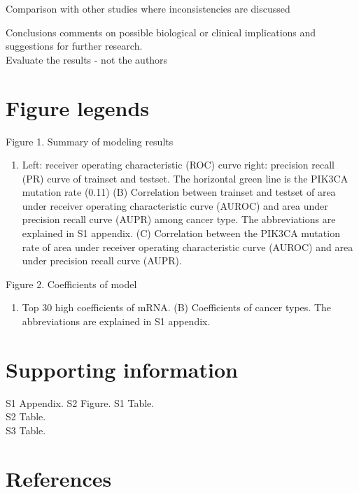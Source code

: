 \documentclass[10pt,letterpaper]{article}
\providecommand{\tightlist}{%
  \setlength{\itemsep}{0pt}\setlength{\parskip}{0pt}}
\begin{document}
Comparison with other studies where inconsistencies are discussed

Conclusions comments on possible biological or clinical implications and
suggestions for further research.\\
Evaluate the results - not the authors

\hypertarget{figure-legends}{%
\section{Figure legends}\label{figure-legends}}

Figure 1. Summary of modeling results

\begin{enumerate}
\def\labelenumi{(\Alph{enumi})}
\tightlist
\item
  Left: receiver operating characteristic (ROC) curve right: precision
  recall (PR) curve of trainset and testset. The horizontal green line
  is the PIK3CA mutation rate (0.11) (B) Correlation between trainset
  and testset of area under receiver operating characteristic curve
  (AUROC) and area under precision recall curve (AUPR) among cancer
  type. The abbreviations are explained in S1 appendix. (C) Correlation
  between the PIK3CA mutation rate of area under receiver operating
  characteristic curve (AUROC) and area under precision recall curve
  (AUPR).
\end{enumerate}

Figure 2. Coefficients of model

\begin{enumerate}
\def\labelenumi{(\Alph{enumi})}
\tightlist
\item
  Top 30 high coefficients of mRNA. (B) Coefficients of cancer types.
  The abbreviations are explained in S1 appendix.
\end{enumerate}

\hypertarget{supporting-information}{%
\section{Supporting information}\label{supporting-information}}

S1 Appendix. S2 Figure. S1 Table.\\
S2 Table.\\
S3 Table.

\hypertarget{references}{%
\section*{References}\label{references}}
\end{document}
